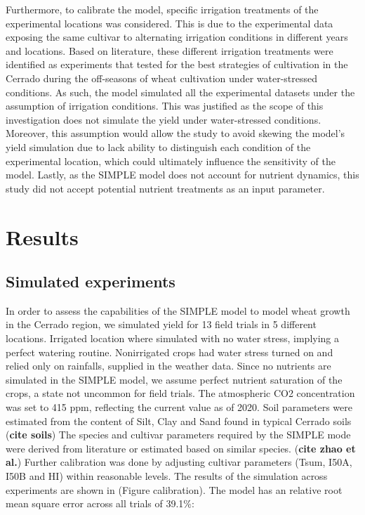 \documentclass[11pt]{article}
\begin{document}
Furthermore, to calibrate the model, specific irrigation treatments of the experimental locations was considered. This is due to the experimental data exposing the same cultivar to alternating irrigation conditions in different years and locations. Based on literature, these different irrigation treatments were identified as experiments that tested for the best strategies of cultivation in the Cerrado during the off-seasons of wheat cultivation under water-stressed conditions. As such, the model simulated all the experimental datasets under the assumption of irrigation conditions. This was justified as the scope of this investigation does not simulate the yield under water-stressed conditions. Moreover, this assumption would allow the study to avoid skewing the model’s yield simulation due to lack ability to distinguish each condition of the experimental location, which could ultimately influence the sensitivity of the model. Lastly, as the SIMPLE model does not account for nutrient dynamics, this study did not accept potential nutrient treatments as an input parameter.


\section{Results}
\label{sec:orga0e6893}
\subsection{Simulated experiments}
\label{sec:org54c05c6}
In order to assess the capabilities of the SIMPLE model to model wheat growth in the Cerrado region, we simulated yield for 13 field trials in 5 different locations. Irrigated location where simulated with no water stress, implying a perfect watering routine. Nonirrigated crops had water stress turned on and relied only on rainfalls, supplied in the weather data. Since no nutrients are simulated in the SIMPLE model, we assume perfect nutrient saturation of the crops, a state not uncommon for field trials. The atmospheric CO2 concentration was set to 415 ppm, reflecting the current value as of 2020. Soil parameters were estimated from the content of Silt, Clay and Sand found in typical Cerrado soils (\textbf{cite soils})
The species and cultivar parameters required by the SIMPLE mode were derived from literature or estimated based on similar species. (\textbf{cite zhao et al.}) Further calibration was done by adjusting cultivar parameters (Tsum, I50A, I50B and HI) within reasonable levels.
The results of the simulation across experiments are shown in (Figure calibration). The model has an relative root mean square error across all trials of 39.1\%:
\end{document}
